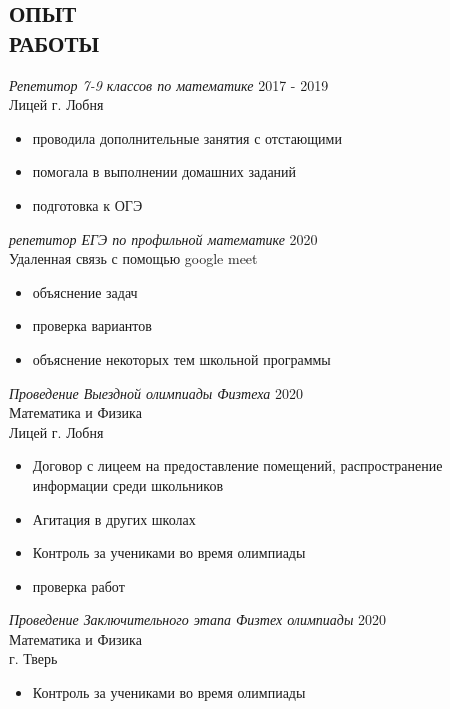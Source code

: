 \documentclass[margin, 10pt]{res}
\begin{document}
\begin{resume}
\section{ОПЫТ \\ РАБОТЫ}

{\sl Репетитор 7-9 классов по математике} \hfill 2017 - 2019 \\
Лицей г. Лобня
\begin{itemize}
\item проводила дополнительные занятия с отстающими
\item помогала в выполнении домашних заданий
\item подготовка к ОГЭ
\end{itemize} 

{\sl репетитор ЕГЭ по профильной математике} \hfill 2020 \\
Удаленная связь с помощью google meet
\begin{itemize}
\item объяснение задач
\item проверка вариантов
\item объяснение некоторых тем школьной программы
\end{itemize} 

{\sl Проведение Выездной олимпиады Физтеха} \hfill 2020 \\
Математика и Физика\\
Лицей г. Лобня
\begin{itemize}
\item Договор с лицеем на предоставление помещений, распространение информации среди школьников
\item Агитация в других школах
\item Контроль за учениками во время олимпиады
\item проверка работ
\end{itemize} 

{\sl Проведение Заключительного этапа Физтех олимпиады} \hfill 2020 \\
Математика и Физика\\
г. Тверь
\begin{itemize}
\item Контроль за учениками во время олимпиады
\end{itemize} 

\end{resume}
\end{document}
